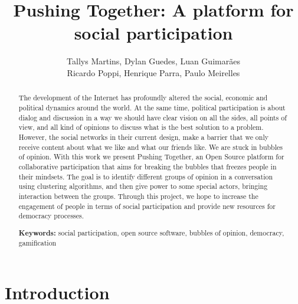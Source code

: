 \documentclass{llncs}
\begin{document}
\sloppy
\title{Pushing Together: A platform for social participation}

\author{Tallys Martins, Dylan Guedes, Luan Guimarães\\
        Ricardo Poppi, Henrique Parra, Paulo Meirelles}



\maketitle
\begin{abstract}

The development of the Internet has profoundly altered the social, economic
and political dynamics around the world. At the same time, political
participation is about dialog and discussion in a way we should have clear
vision on all the sides, all points of view, and all kind of opinions to
discuss what is the best solution to a problem. However, the social networks
in their current design, make a barrier that we
only receive content about what we like and what our friends
like. We are stuck in bubbles of opinion.  With this work we present Pushing
Together, an Open Source platform for collaborative participation that aims for
breaking the bubbles that freezes people in their mindsets. The goal is to
identify different groups of opinion in a conversation using clustering
algorithms, and then give power to some special actors, bringing interaction
between the groups. Through this project, we hope to increase the engagement of
people in terms of social participation and provide new resources for democracy
processes.

\textbf{Keywords:} social participation, open source software, bubbles of
opinion, democracy, gamification
\end{abstract}

\section{Introduction}
\label{sec:intro}
\end{document}
